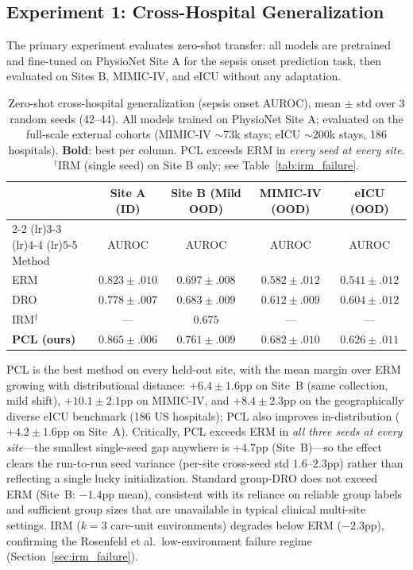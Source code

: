 \documentclass{article}
\begin{document}
\subsection{Experiment 1: Cross-Hospital Generalization}
\label{sec:exp1}

The primary experiment evaluates zero-shot transfer: all models are pretrained and fine-tuned on PhysioNet Site A for the sepsis onset prediction task, then evaluated on Sites B, MIMIC-IV, and eICU without any adaptation.

\begin{table}[htbp]
\caption{Zero-shot cross-hospital generalization (sepsis onset AUROC), mean $\pm$ std over 3 random seeds (42--44). All models trained on PhysioNet Site A; evaluated on the full-scale external cohorts (MIMIC-IV $\sim$73k stays; eICU $\sim$200k stays, 186 hospitals). \textbf{Bold}: best per column. PCL exceeds ERM in \emph{every seed at every site}. $^\dagger$IRM (single seed) on Site B only; see Table~\ref{tab:irm_failure}.}
\label{tab:main_results}
\centering
\small
\begin{tabular}{@{}lcccc@{}}
\toprule
& \multicolumn{1}{c}{Site A (ID)} & \multicolumn{1}{c}{Site B (Mild OOD)} & \multicolumn{1}{c}{MIMIC-IV (OOD)} & \multicolumn{1}{c}{eICU (OOD)} \\
\cmidrule(lr){2-2} \cmidrule(lr){3-3} \cmidrule(lr){4-4} \cmidrule(lr){5-5}
Method & AUROC & AUROC & AUROC & AUROC \\
\midrule
ERM & $0.823{\pm}.010$ & $0.697{\pm}.008$ & $0.582{\pm}.012$ & $0.541{\pm}.012$ \\
DRO & $0.778{\pm}.007$ & $0.683{\pm}.009$ & $0.612{\pm}.009$ & $0.604{\pm}.012$ \\
IRM$^\dagger$ & --- & $0.675$ & --- & --- \\
\textbf{PCL (ours)} & $\mathbf{0.865{\pm}.006}$ & $\mathbf{0.761{\pm}.009}$ & $\mathbf{0.682{\pm}.010}$ & $\mathbf{0.626{\pm}.011}$ \\
\bottomrule
\end{tabular}
\end{table}

PCL is the best method on every held-out site, with the mean margin over ERM growing with distributional distance: $+6.4{\pm}1.6$pp on Site~B (same collection, mild shift), $+10.1{\pm}2.1$pp on MIMIC-IV, and $+8.4{\pm}2.3$pp on the geographically diverse eICU benchmark (186 US hospitals); PCL also improves in-distribution ($+4.2{\pm}1.6$pp on Site~A).
Critically, PCL exceeds ERM in \emph{all three seeds at every site}---the smallest single-seed gap anywhere is $+4.7$pp (Site~B)---so the effect clears the run-to-run seed variance (per-site cross-seed std $1.6$--$2.3$pp) rather than reflecting a single lucky initialization.
Standard group-DRO does not exceed ERM (Site~B: $-1.4$pp mean), consistent with its reliance on reliable group labels and sufficient group sizes that are unavailable in typical clinical multi-site settings.
IRM ($k{=}3$ care-unit environments) degrades below ERM ($-2.3$pp), confirming the Rosenfeld et al.\ low-environment failure regime (Section~\ref{sec:irm_failure}).
\end{document}
